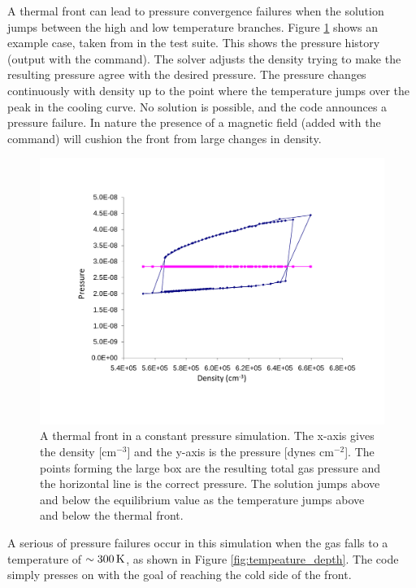 A thermal front can lead to pressure convergence failures when the
solution jumps between the high and low temperature branches.
Figure \ref{fig:pressure_density}
shows an example case, taken from 
in the test suite.
This shows the pressure history (output with the
 command).
The solver adjusts the density trying to make the resulting
pressure agree with the desired pressure.
The pressure changes continuously
with density up to the point where the temperature jumps over the peak in
the cooling curve.
No solution is possible, and the code announces a
pressure failure.
In nature the presence of a magnetic field (added with
the  command) will cushion the front
from large changes in density.

\begin{figure}
\centering
\includegraphics[scale=0.5]{pressure_density}
\caption[Thermal front]{\label{fig:pressure_density}A thermal front in a
constant pressure simulation.  The x-axis
gives the density [cm$^{-3}$] and the y-axis is the pressure
[dynes cm$^{-2}$].
The
points forming the large box are the resulting total gas pressure and the
horizontal line is the correct pressure.
The solution jumps above and below
the equilibrium value as the temperature jumps above and below the thermal
front.}
\end{figure}

A serious of pressure failures occur in this simulation when the gas
falls to a temperature of $\sim 300 {\rm\thinspace K}$,
as shown in Figure \ref{fig:tempeature_depth}.
The code simply
presses on with the goal of reaching the cold side of the front.

